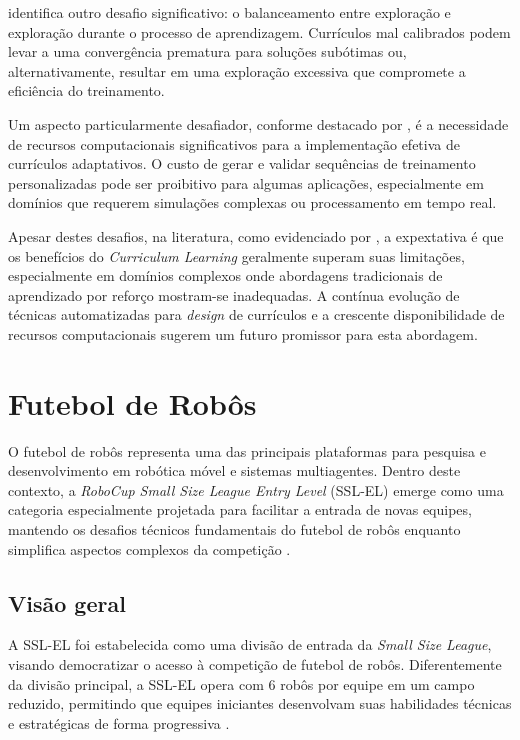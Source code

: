  \cite{curriculum} identifica outro desafio significativo: o balanceamento entre exploração e exploração durante o processo de aprendizagem. Currículos mal calibrados podem levar a uma convergência prematura para soluções subótimas ou, alternativamente, resultar em uma exploração excessiva que compromete a eficiência do treinamento.

Um aspecto particularmente desafiador, conforme destacado por \cite{curml}, é a necessidade de recursos computacionais significativos para a implementação efetiva de currículos adaptativos. O custo de gerar e validar sequências de treinamento personalizadas pode ser proibitivo para algumas aplicações, especialmente em domínios que requerem simulações complexas ou processamento em tempo real.

Apesar destes desafios, na literatura, como evidenciado por \cite{curriculum_learning_a_survey}, a expextativa é que os benefícios do \textit{Curriculum Learning} geralmente superam suas limitações, especialmente em domínios complexos onde abordagens tradicionais de aprendizado por reforço mostram-se inadequadas. A contínua evolução de técnicas automatizadas para \textit{design} de currículos e a crescente disponibilidade de recursos computacionais sugerem um futuro promissor para esta abordagem.

\section{Futebol de Robôs}
\label{sec:futebol_robos}

O futebol de robôs representa uma das principais plataformas para pesquisa e desenvolvimento em robótica móvel e sistemas multiagentes. Dentro deste contexto, a \textit{RoboCup Small Size League Entry Level} (SSL-EL) emerge como uma categoria especialmente projetada para facilitar a entrada de novas equipes, mantendo os desafios técnicos fundamentais do futebol de robôs enquanto simplifica aspectos complexos da competição \cite{regras_ssl_el_2024}.

\subsection{Visão geral}
\label{subsec:futebol_visao}

A SSL-EL foi estabelecida como uma divisão de entrada da \textit{Small Size League}, visando democratizar o acesso à competição de futebol de robôs. Diferentemente da divisão principal, a SSL-EL opera com 6 robôs por equipe em um campo reduzido, permitindo que equipes iniciantes desenvolvam suas habilidades técnicas e estratégicas de forma progressiva \cite{regras_ssl_el_2024}.

